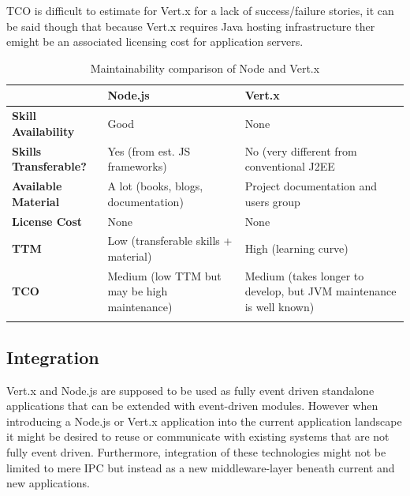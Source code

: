 TCO is difficult to estimate for Vert.x for a lack of success/failure stories, it can be said though that because Vert.x requires Java hosting infrastructure ther emight be an associated licensing cost for application servers.



\begin{savenotes}
\begin{longtable}[c]{p{} p{} p{}}
\toprule
				& \textbf{Node.js} & \textbf{Vert.x} \\
\midrule 
\endhead
\textbf{Skill Availability}		& Good			& None%
\\							  
\textbf{Skills Transferable?}	& Yes (from est. JS frameworks)	& No (very different from conventional J2EE\nomenclature{J2EE}{Java 2 Enterprise  Edition}
\\
\textbf{Available Material}		& A lot (books, blogs, documentation) & Project documentation and users group
\\
\textbf{License Cost}			& None 			& None
 \\
 \textbf{TTM} 					& Low (transferable skills + material) & High (learning curve)
 \\
 \textbf{TCO}					& Medium (low TTM but may be high maintenance) & Medium (takes longer to develop, but JVM maintenance is well known)
 \\
\bottomrule 
  \caption{Maintainability comparison of Node and Vert.x}
  \label{tbl_maintain}
\end{longtable}
\end{savenotes}

\subsection{Integration}
\label{integration}
Vert.x and Node.js are supposed to be used as fully event driven standalone
applications that can be extended with event-driven modules.
However when introducing a Node.js or Vert.x application into the current
application landscape it might be desired to reuse or communicate with existing
systems that are not fully event driven. Furthermore, integration of these technologies might not be limited to mere IPC but instead as a new middleware-layer beneath current and new applications.\\

